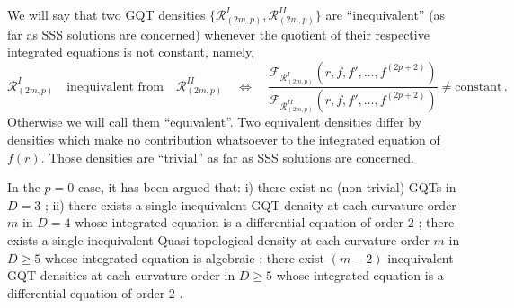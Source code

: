 \documentclass[11pt]{article}
\newcommand{\ie}{{\it i.e.,}\ }
\begin{document}
{We will say that two GQT densities $\{ \mathcal{R}^{I}_{(2m,p)} ,\mathcal{R}^{II}_{(2m,p)} \}$ are ``inequivalent'' (as far as  SSS  solutions are  concerned) whenever the quotient of their respective integrated equations is not constant, namely,
\begin{equation}
\mathcal{R}^{I}_{(2m,p)} \quad \text{inequivalent from} \quad \mathcal{R}^{II}_{(2m,p)} \quad \Leftrightarrow \quad  \frac{\mathcal{F}_{\mathcal{R}^I_{(2m,p)}}(r,f,f',\dots,f^{(2p+2)}) }{\mathcal{F}_{\mathcal{R}^{II}_{(2m,p)}} (r,f,f',\dots,f^{(2p+2)})} \neq \text{constant} \, .
\end{equation}
Otherwise we will call them ``equivalent''. Two equivalent densities differ by densities which make no contribution whatsoever to the integrated equation of $f(r)$. Those densities are ``trivial'' as far as SSS solutions are concerned. 

 In the $p=0$ case, it has been argued that: i) there exist no (non-trivial) GQTs in $D=3$ \cite{Bueno:2022lhf}; ii) there exists a single inequivalent GQT density at each curvature order $m$ in $D=4$ whose integrated equation is a differential equation of order $2$ \cite{Moreno:2023rfl}; there exists a single inequivalent Quasi-topological density at each curvature order $m$ in $D\ge 5$ whose integrated equation is algebraic  \cite{Bueno:2022res}; there exist $(m-2)$ inequivalent GQT densities at each  curvature order in $D\ge 5$ whose integrated equation is a differential equation of order $2$  \cite{Bueno:2022res,Moreno:2023rfl}.





}
\end{document}
